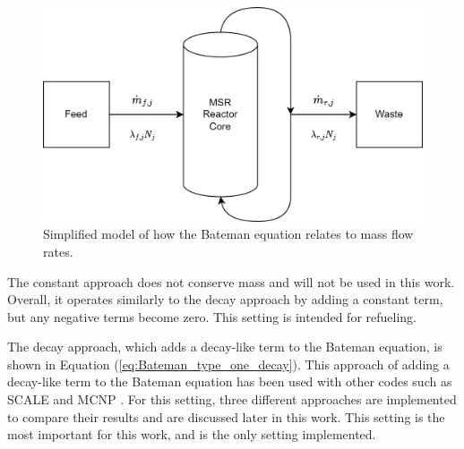 \begin{figure}[H]
  \centering
  \includegraphics[scale=0.15]{images/msr-feed-repr.png}
  \caption{Simplified model of how the Bateman equation relates to mass flow rates.}
   \label{fig:msr-outline-fig-show}
\end{figure}


The constant approach does not conserve mass and will not be used in this work. Overall, it operates similarly to the decay approach by adding a constant term, but any negative terms become zero. This setting is intended for refueling.

The decay approach, which adds a decay-like term to the Bateman equation, is shown in Equation (\ref{eq:Bateman_type_one_decay}). This approach of adding a decay-like term to the Bateman equation has been used with other codes such as SCALE and MCNP \cite{jr_vicente_valdez_modeling_2020, rodriguez-vieitez_transmutation_2002}. For this setting, three different approaches are implemented to compare their results and are discussed later in this work. This setting is the most important for this work, and is the only setting implemented.



